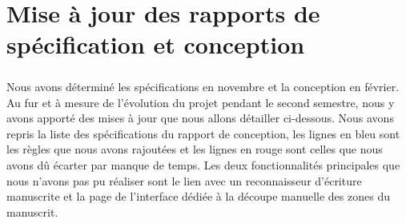 \chapter{Mise à jour des rapports de spécification et conception}

\paragraph{}
Nous avons déterminé les spécifications en novembre et la conception en février. Au fur et à mesure de l'évolution du projet pendant le second semestre, nous y avons apporté des mises à jour que nous allons détailler ci-dessous. Nous avons repris la liste des spécifications du rapport de conception, les lignes en bleu sont les règles que nous avons rajoutées et les lignes en rouge sont celles que nous avons dû écarter par manque de temps. Les deux fonctionnalités principales que nous n'avons pas pu réaliser sont le lien avec un reconnaisseur d'écriture manuscrite et la page de l'interface dédiée à la découpe manuelle des zones du manuscrit.

